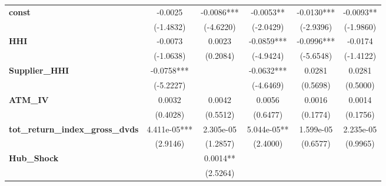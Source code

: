 \begin{center}
\begin{tabular}{lccccc}
\textbf{const}                                &        -0.0025        &       -0.0086***       &       -0.0053**        &         -0.0130***         &         -0.0093**          \\
\textbf{ }                                    &       (-1.4832)       &       (-4.6220)        &       (-2.0429)        &         (-2.9396)          &         (-1.9860)          \\
\textbf{HHI}                                  &        -0.0073        &         0.0023         &       -0.0859***       &         -0.0996***         &          -0.0174           \\
\textbf{ }                                    &       (-1.0638)       &        (0.2084)        &       (-4.9424)        &         (-5.6548)          &         (-1.4122)          \\
\textbf{Supplier\_HHI}                        &       -0.0758***      &                        &       -0.0632***       &           0.0281           &           0.0281           \\
\textbf{ }                                    &       (-5.2227)       &                        &       (-4.6469)        &          (0.5698)          &          (0.5000)          \\
\textbf{ATM\_IV}                              &         0.0032        &         0.0042         &         0.0056         &           0.0016           &           0.0014           \\
\textbf{ }                                    &        (0.4028)       &        (0.5512)        &        (0.6477)        &          (0.1774)          &          (0.1756)          \\
\textbf{tot\_return\_index\_gross\_dvds}      &      4.411e-05***     &       2.305e-05        &      5.044e-05**       &         1.599e-05          &         2.235e-05          \\
\textbf{ }                                    &        (2.9146)       &        (1.2857)        &        (2.4000)        &          (0.6577)          &          (0.9965)          \\
\textbf{Hub\_Shock}                           &                       &        0.0014**        &                        &                            &                            \\
\textbf{ }                                    &                       &        (2.5264)        &                        &                            &                            \\

\end{tabular}
\end{center}
